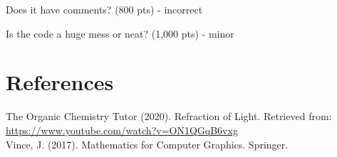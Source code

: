 \documentclass[12pt]{article}
\begin{document}
	Does it have comments? (800 pts) - incorrect
	
	Is the code a huge mess or neat? (1,000 pts) - minor
	
	\section{References}
	
	
	The Organic Chemistry Tutor (2020). Refraction of Light. Retrieved from: \url{https://www.youtube.com/watch?v=ON1QGqB6vxg}\\
	
	Vince, J. (2017). Mathematics for Computer Graphics. Springer.
	
	
	
	
	
	
	
	
	
	
	
	
	
\end{document}
